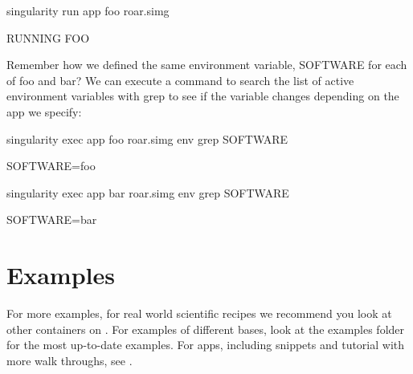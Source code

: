 \documentclass[letterpaper,10pt,english]{sphinxmanual}
\begin{document}

%
\begin{sphinxVerbatim}[commandchars=\\\{\}]
singularity run \PYGZhy{}\PYGZhy{}app foo roar.simg

RUNNING FOO
\end{sphinxVerbatim}


Remember how we defined the same environment variable, SOFTWARE for
each of foo and bar? We can execute a command to search the list of
active environment variables with grep to see if the variable changes
depending on the app we specify:

%
\begin{sphinxVerbatim}[commandchars=\\\{\}]
\PYGZdl{} singularity exec \PYGZhy{}\PYGZhy{}app foo roar.simg env \textbar{} grep SOFTWARE

SOFTWARE=foo

\PYGZdl{} singularity exec \PYGZhy{}\PYGZhy{}app bar roar.simg env \textbar{} grep SOFTWARE

SOFTWARE=bar
\end{sphinxVerbatim}


\section{Examples}
\label{\detokenize{container_recipes:examples}}
For more examples, for real world scientific recipes we recommend you
look at other containers on . For examples of
different bases, look at the examples folder for the most up-to-date
examples. For apps, including snippets and tutorial with more walk
throughs, see .
\end{document}
